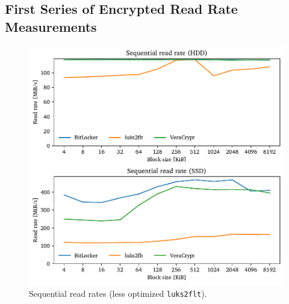 \subsection{First Series of Encrypted Read Rate Measurements}
\label{chap:performance.hwexperiments.encryptedseries1}

\begin{figure}[htb!]
	\center
	\includegraphics[scale=1]{../fig/performance.hwexperiments.beforeoptseq.pdf}
	\caption[
		Sequential read rates (less optimized \texttt{luks2flt})
	]{
		Sequential read rates (less optimized \texttt{luks2flt}). 
	}
	\label{fig:performance.hwexperiments.beforeoptseq}
\end{figure}

